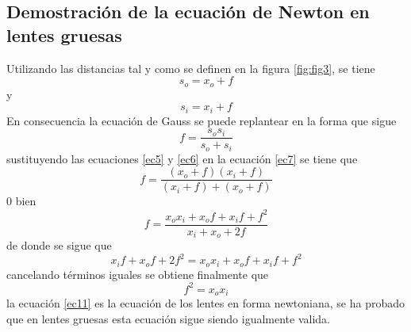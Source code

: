 \documentclass[13,twocolumn,letterpaper]{article}
\begin{document}
{	\subsection{Demostraci\'on de la ecuaci\'on de Newton en lentes gruesas }
	{
		Utilizando las distancias tal y como se definen en la figura \ref{fig:fig3}, se tiene 
		\begin{equation}\label{ec5}
			s_{o}=x_{o}+f
		\end{equation}
		y 
		\begin{equation}\label{ec6}
			s_{i}=x_{i}+f
		\end{equation}
		En consecuencia la ecuaci\'on de Gauss se puede replantear en la forma que sigue
		\begin{equation}\label{ec7}
			f=\dfrac{s_{o}s_{i}}{s_{o}+s_{i}}
		\end{equation}
		sustituyendo las ecuaciones \ref{ec5} y \ref{ec6} en la ecuaci\'on \ref{ec7} se tiene que 
		\begin{equation}
			f=\dfrac{(x_{o}+f)(x_{i}+f)}{(x_{i}+f)+(x_{o}+f)}
		\end{equation}
		0 bien
		\begin{equation}
			f=\dfrac{x_{o}x_{i}+x_{o}f+x_{i}f+f^{2}}{x_{i}+x_{o}+2f}
		\end{equation}
		de donde se sigue que 
		\begin{equation}
		x_{i}f+x_{o}f+2f^{2}=x_{o}x_{i}+x_{o}f+x_{i}f+f^{2}
		\end{equation}
		cancelando t\'erminos iguales se obtiene finalmente que 
		\begin{equation}\label{ec11}
			f^{2}=x_{o}x_{i}
		\end{equation}
		la ecuaci\'on \ref{ec11} es la ecuaci\'on de los lentes en forma newtoniana, se ha probado que en lentes gruesas esta ecuaci\'on sigue siendo igualmente valida.
		
	}
	
}
\end{document}
